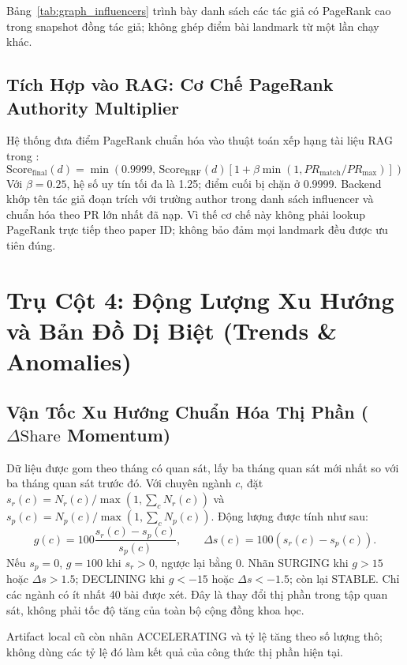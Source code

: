 Bảng~\ref{tab:graph_influencers} trình bày danh sách các tác giả có PageRank cao trong snapshot đồng tác giả; không ghép điểm bài landmark từ một lần chạy khác.



\subsection{Tích Hợp vào RAG: Cơ Chế PageRank Authority Multiplier}
Hệ thống đưa điểm PageRank chuẩn hóa vào thuật toán xếp hạng tài liệu RAG trong :
\begin{equation}
  \text{Score}_{\text{final}}(d) = \min\!\left(0.9999,\,\text{Score}_{\text{RRF}}(d)\left[1+\beta\min(1, PR_{\mathrm{match}}/PR_{\max})\right]\right)
\end{equation}
Với $\beta=0.25$, hệ số uy tín tối đa là 1.25; điểm cuối bị chặn ở 0.9999. Backend khớp tên tác giả đoạn trích với trường author trong danh sách influencer và chuẩn hóa theo PR lớn nhất đã nạp. Vì thế cơ chế này không phải lookup PageRank trực tiếp theo paper ID; không bảo đảm mọi landmark đều được ưu tiên đúng.

\section{Trụ Cột 4: Động Lượng Xu Hướng và Bản Đồ Dị Biệt (Trends \& Anomalies)}

\subsection{Vận Tốc Xu Hướng Chuẩn Hóa Thị Phần ($\Delta\text{Share}$ Momentum)}
Dữ liệu được gom theo tháng có quan sát, lấy ba tháng quan sát mới nhất so với ba tháng quan sát trước đó. Với chuyên ngành $c$, đặt $s_r(c)=N_r(c)/\max(1,\sum_c N_r(c))$ và $s_p(c)=N_p(c)/\max(1,\sum_c N_p(c))$. Động lượng được tính như sau:
\begin{equation}
g(c)=100\frac{s_r(c)-s_p(c)}{s_p(c)},\qquad \Delta s(c)=100(s_r(c)-s_p(c)).
\end{equation}
Nếu $s_p=0$, $g=100$ khi $s_r>0$, ngược lại bằng 0. Nhãn SURGING khi $g>15$ hoặc $\Delta s>1.5$; DECLINING khi $g<-15$ hoặc $\Delta s<-1.5$; còn lại STABLE. Chỉ các ngành có ít nhất 40 bài được xét. Đây là thay đổi thị phần trong tập quan sát, không phải tốc độ tăng của toàn bộ cộng đồng khoa học.

Artifact local cũ còn nhãn ACCELERATING và tỷ lệ tăng theo số lượng thô; không dùng các tỷ lệ đó làm kết quả của công thức thị phần hiện tại.

